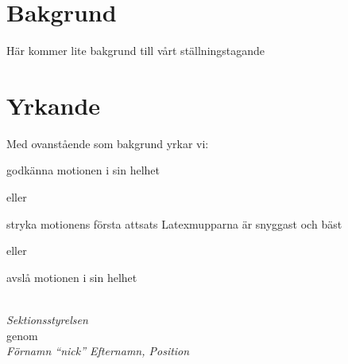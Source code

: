 \documentclass{dtek}
\begin{document}
\maketitle

\section*{Bakgrund}

Här kommer lite bakgrund till vårt ställningstagande 

\section*{Yrkande}
Med ovanstående som bakgrund yrkar vi:

\begin{attsatser}
  \att godkänna motionen i sin helhet
\end{attsatser}
eller
\begin{attsatser}
  \att stryka motionens första attsats
  \att Latexmupparna är snyggast och bäst 
\end{attsatser}
eller
\begin{attsatser}
  \att avslå motionen i sin helhet 
\end{attsatser}

\ \\
\textit{Sektionsstyrelsen}\\
genom\\
\textit{Förnamn \enquote{nick} Efternamn, Position}
\end{document}
